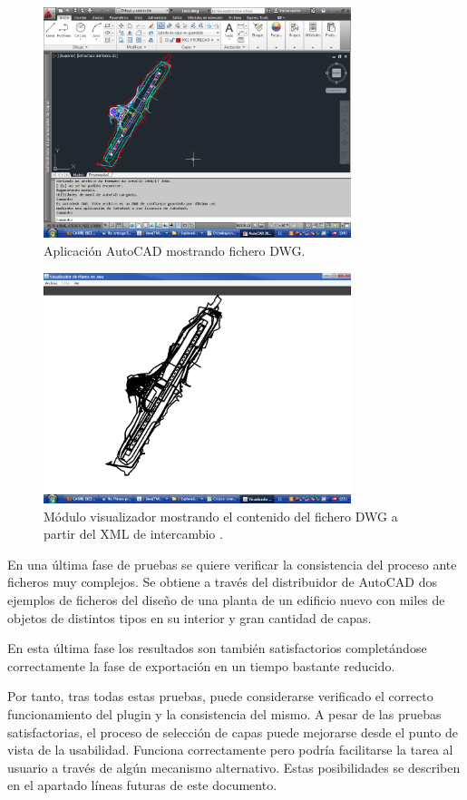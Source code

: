 \begin{figure}[H]
\begin{center}
\includegraphics[width=0.8\textwidth]{imgs/autocadleco}
\caption{Aplicación AutoCAD mostrando fichero DWG.}
\end{center}
\end{figure}

\begin{figure}[H]
\begin{center}
\includegraphics[width=0.8\textwidth]{imgs/ejemplo_salida_2}
\caption{Módulo visualizador mostrando el contenido del fichero DWG a partir del XML de intercambio \cite{Luis-Fernandez-SSII}.}
\end{center}
\end{figure}

En una última fase de pruebas se quiere verificar la consistencia del proceso ante ficheros muy complejos. Se obtiene a través del distribuidor de AutoCAD dos ejemplos de ficheros del diseño de una planta de un edificio nuevo con miles de objetos de distintos tipos en su interior y gran cantidad de capas. 

En esta última fase los resultados son también satisfactorios completándose correctamente la fase de exportación en un tiempo bastante reducido.

Por tanto, tras todas estas pruebas, puede considerarse verificado el correcto funcionamiento del plugin y la consistencia del mismo. A pesar de las pruebas satisfactorias, el proceso de selección de capas puede mejorarse desde el punto de vista de la usabilidad. Funciona correctamente pero podría facilitarse la tarea al usuario a través de algún mecanismo alternativo. Estas posibilidades se describen en el apartado líneas futuras de este documento.

